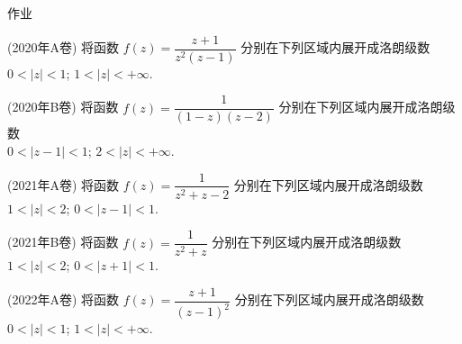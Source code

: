 {
\homework
\begin{frame}[<*>]{作业}
  \begin{homeworks}
    \item(2020年A卷) 将函数 $f(z)=\dfrac{z+1}{z^2(z-1)}$ 分别在下列区域内展开成洛朗级数\\
    \indent {} $0<|z|<1$; \hspace{2em}  $1<|z|<+\infty$.
    \item(2020年B卷) 将函数 $f(z)=\dfrac1{(1-z)(z-2)}$ 分别在下列区域内展开成洛朗级数\\
    \indent {} $0<|z-1|<1$; \hspace{2em}  $2<|z|<+\infty$.
    \item(2021年A卷) 将函数 $f(z)=\dfrac1{z^2+z-2}$ 分别在下列区域内展开成洛朗级数\\
    \indent {} $1<|z|<2$; \hspace{2em}  $0<|z-1|<1$.
    \item(2021年B卷) 将函数 $f(z)=\dfrac1{z^2+z}$ 分别在下列区域内展开成洛朗级数\\
    \indent {} $1<|z|<2$; \hspace{2em}  $0<|z+1|<1$.
    \item(2022年A卷) 将函数 $f(z)=\dfrac{z+1}{(z-1)^2}$ 分别在下列区域内展开成洛朗级数\\
    \indent {} $0<|z|<1$; \hspace{2em}  $1<|z|<+\infty$.
  \end{homeworks}
\end{frame}
}










